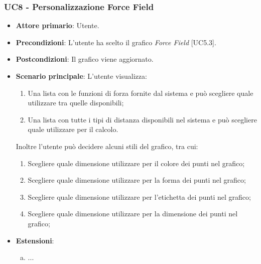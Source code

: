 \subsubsection{UC8 - Personalizzazione Force Field}
\begin{itemize}
	\item \textbf{Attore primario}: Utente.
	
	\item \textbf{Precondizioni}: L'utente ha scelto il grafico \textit{Force Field} [UC5.3].
	
	\item \textbf{Postcondizioni}: Il grafico viene aggiornato.
	
	\item \textbf{Scenario principale}: L'utente visualizza:
	
\begin{enumerate}
	\item Una lista con le funzioni di forza fornite dal sistema e può scegliere quale utilizzare tra quelle disponibili; 
	\item Una lista con tutte i tipi di distanza disponibili nel sistema e può scegliere quale utilizzare per il calcolo. 
\end{enumerate}	
	Inoltre l'utente può decidere alcuni stili del grafico, tra cui:
		\begin{enumerate}
			\item Scegliere quale dimensione utilizzare per il colore dei punti nel grafico;
				
			\item Scegliere quale dimensione utilizzare per la forma dei punti nel grafico;
			
			\item Scegliere quale dimensione utilizzare per l'etichetta dei punti nel grafico;
			
			\item Scegliere quale dimensione utilizzare per la dimensione dei punti nel grafico;
				
		\end{enumerate}
		
	\item \textbf{Estensioni}:
	\begin{enumerate}[(a)]
		\item ...
	\end{enumerate}
\end{itemize}

